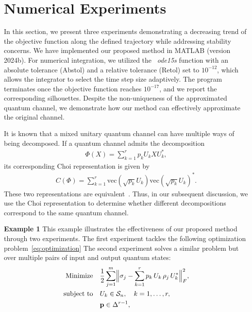 \documentclass[onefignum,onetabnum]{siamart220329}
\begin{document}
    
    
    \section{Numerical Experiments}
    In this section, we present three experiments demonstrating a decreasing trend of the objective function along the defined trajectory while addressing stability concerns. We have implemented our proposed method in MATLAB (version 2024b). For numerical integration, we utilized the ~\emph{ode15s} function with an absolute tolerance (Abstol) and a relative tolerance (Retol) set to $10^{-12}$, which allows the integrator to select the time step size adaptively. The program terminates once the objective function reaches $10^{-17}$, and {\color{red}we report the corresponding silhouettes. Despite the non-uniqueness of the approximated quantum channel, we demonstrate how our method can effectively approximate the original channel.}
    
    It is known that a mixed unitary quantum channel can have multiple ways of being decomposed. If a quantum channel admits the decomposition  
    \begin{eqnarray*}  
      \Phi(X) = \sum_{k=1}^r p_k U_k X U_k^{*},  
    \end{eqnarray*}  
    its corresponding Choi representation is given by  
    \begin{eqnarray*}  
        C(\Phi) = \sum_{k=1}^r \mathrm{vec}(\sqrt{p_k} U_k) \mathrm{vec}(\sqrt{p_k} U_k)^{*}.  
    \end{eqnarray*}  
    These two representations are equivalent~\cite{choi75, Watrous2018}. Thus, in our subsequent discussion, we use the Choi representation to determine whether different decompositions correspond to the same quantum channel.
    
    
    {\bf Example 1}
    This example illustrates the effectiveness of our proposed method through two experiments. 
    The first experiment tackles the following optimization problem~\eqref{eq:optimization}
    The second experiment solves a similar problem but over multiple pairs of input and output quantum states:
   \begin{subequations}\label{eq:example1multi}
    \begin{align}
    \text{Minimize} & \quad \frac{1}{2} \sum_{j=1}^m \Bigl\|\sigma_j - \sum_{k = 1}^r p_k\,U_k\,\rho_j\,U_k^*\Bigr\|_F^2, \\
    \text{subject to} & \quad U_k \in \mathcal{S}_n, \quad k = 1, \ldots, r, \\
    & \quad \mathbf{p} \in \Delta^{r-1},
    \end{align}
    \end{subequations}
 
\end{document}
